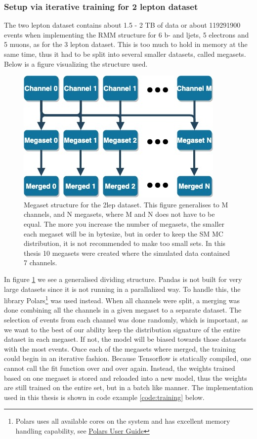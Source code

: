 \subsubsection*{Setup via iterative training for 2 lepton dataset}
The two lepton dataset contains about 1.5 - 2 TB of data or about 119291900 events when implementing the RMM structure for 6 
b- and ljets, 5 electrons and 5 muons, as for the 3 lepton dataset. This is too much to hold in memory at the same time, thus it had to 
be split into several smaller datasets, called megasets. Below is a figure visualizing the structure used. 

\begin{figure}[H]
    \centering
    \includegraphics[width=0.6\linewidth]{Figures/2lep_config/megaset_struct.jpeg}
    \caption[Megaset structure diagram]{Megaset structure for the 2lep dataset. This figure generalises to M channels, and N megasets, 
    where M and N does not have to be equal. The more you increase the number of megasets, 
    the smaller each megaset will be in bytesize, but in order to keep the SM MC distribution, it is not recommended to make too small sets. 
    In this thesis 10 megasets were created where the simulated data contained 7 channels. }
    \label{fig:2lep_struct}
\end{figure}




In figure \ref{fig:2lep_struct} we see a generalised dividing structure. Pandas is not 
built for very large datasets since it is not running in a parallalized way. To handle this, the library
Polars\footnote{Polars uses all available cores on the system and has excellent memory 
handling capability, see \href{https://pola-rs.github.io/polars-book/user-guide/}{Polars User Guide}}
\cite{ritchie_vink_2023_7744139} was used instead. When all channels were split, a merging was done combining all the channels in a given 
megaset to a separate dataset. The selection of events from each channel was done randomly, 
which is important, as we want to the best of our ability keep the distribution signature of the entire dataset in each megaset. If not, the model will 
be biased towards those datasets with the most events. Once each of the megasets where merged, the training could begin in an iterative fashion. Because
Tensorflow is statically compiled, one cannot call the fit function over and over again. Instead, the weights trained based on one megaset is stored and 
reloaded into a new model, thus the weights are still trained on the entire set, but in a batch like manner. 
The implementation used in this thesis is shown in code example \ref{code:training} below.



